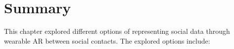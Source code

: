 \section{Summary}

This chapter explored different options of representing social data through wearable AR between social contacts. The explored options include: 

